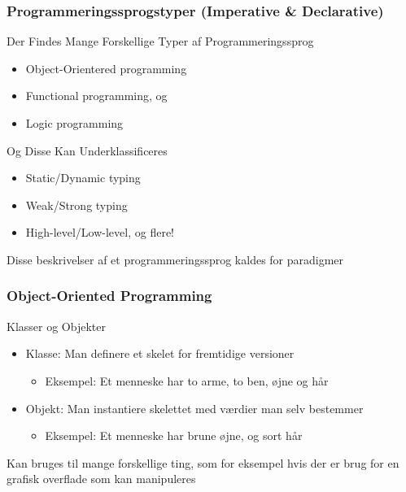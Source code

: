\documentclass[12pt,t]{beamer}
\begin{document}
\begin{frame}
 \frametitle{Programmeringssprogstyper {\tiny (Imperative \& Declarative)}}
 \begin{block}{Der Findes Mange Forskellige Typer af Programmeringssprog}
 \begin{itemize}
  \item Object-Orientered programming
  \item Functional programming, og
  \item Logic programming
 \end{itemize}
 \end{block}
 \begin{exampleblock}{Og Disse Kan Underklassificeres}
 \begin{itemize}
 \item Static/Dynamic typing
 \item Weak/Strong typing
 \item High-level/Low-level, og flere!
 \end{itemize}
 \end{exampleblock}
 Disse beskrivelser af et programmeringssprog kaldes for paradigmer
\end{frame}

\begin{frame}
\frametitle{Object-Oriented Programming}
\begin{block}{Klasser og Objekter}
\begin{itemize}
\item Klasse: Man definere et skelet for fremtidige versioner\\
\begin{itemize}
\item Eksempel: Et menneske har to arme, to ben, øjne og hår
\end{itemize} 
\item Objekt: Man instantiere skelettet med værdier man selv bestemmer\\
\begin{itemize}
\item Eksempel: Et menneske har brune øjne, og sort hår
\end{itemize}
\end{itemize}
\end{block}
\begin{block}{}
Kan bruges til mange forskellige ting, som for eksempel hvis der er brug for 
en grafisk overflade som kan manipuleres
\end{block}
\end{frame}
\end{document}
